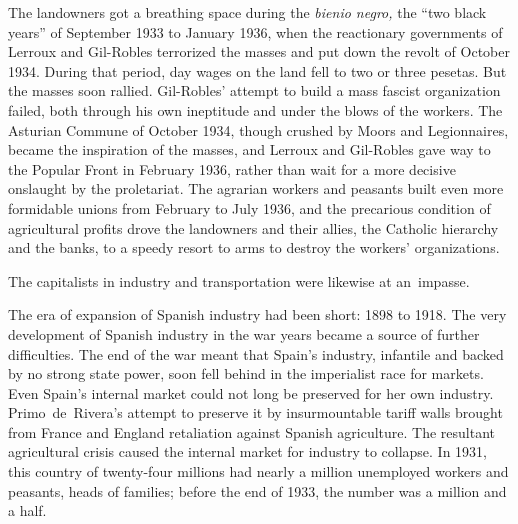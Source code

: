 The landowners got a breathing space during the \emph{bienio negro,}{\indexbienionegro} the ``two black years'' of September 1933 to January 1936, when the reactionary governments of Lerroux and Gil-Robles{\indexALerroux\indexGRobles} terrorized the masses and put down the revolt of October 1934. During that period, day wages on the land fell to two or three pesetas. But the masses soon rallied. Gil-Robles’ attempt to build a mass fascist organization failed, both through his own ineptitude and under the blows of the workers.
The Asturian Commune of October 1934, though crushed by Moors and Legionnaires, became the inspiration of the masses, and Lerroux and Gil-Robles gave way to the Popular Front in February 1936, rather than wait for a more decisive onslaught by the proletariat. The agrarian workers and peasants built even more formidable unions from February to July 1936, and the precarious condition of agricultural profits drove the landowners and their allies, the Catholic hierarchy and the banks, to a speedy resort to arms to destroy the workers’ organizations.

The capitalists in industry and transportation were likewise at an~impasse.

The era of expansion of Spanish industry had been short: 1898 to 1918. The very development of Spanish industry in the war years became a source of further difficulties. The end of the war meant that Spain’s industry, infantile and backed by no strong state power, soon fell behind in the imperialist race for markets. Even Spain’s internal market could not long be preserved for her own industry. Primo~de~Rivera’s attempt to preserve it by insurmountable tariff walls brought from France and England retaliation against Spanish agriculture. The resultant agricultural crisis caused the internal market for industry to collapse. In 1931, this country of twenty-four millions had nearly a million unemployed workers and peasants, heads of families; before the end of 1933, the number was a million and a half.

